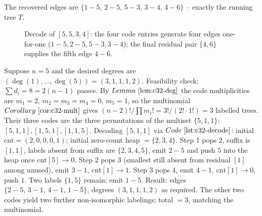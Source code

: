 The recovered edges are \(\{1\!-\!5,\,2\!-\!5,\,5\!-\!3,\,3\!-\!4,\,4\!-\!6\}\)
-- exactly the running tree \(T\).

\begin{figure}[H]
\centering
{}
\caption{Decode of \([5,5,3,4]\): the four code entries generate four edges
one-for-one (\(1\!-\!5, 2\!-\!5, 5\!-\!3, 3\!-\!4\)); the final residual pair
\(\{4,6\}\) supplies the fifth edge \(4\!-\!6\).}
\label{fig:c32-decode}
\end{figure}

\begin{insightbox}
Suppose \(n=5\) and the desired degrees are \((\deg(1),\dots,\deg(5)) =
(3,1,1,1,2)\).  Feasibility check: \(\sum d_i = 8 = 2(n-1)\) passes.
By \(\lemref{c32-deg}\) the code multiplicities are \(m_1=2,\, m_2=m_3=m_4=0,
\,m_5=1\), so the multinomial \(\corref{c32-mult}\) gives \((n-2)!/\prod m_i!
= 3!/(2!\cdot 1!) = 3\) labelled trees.  Their three codes are the three
permutations of the multiset \(\{5,1,1\}\): \([5,1,1], [1,5,1], [1,1,5]\).
Decoding \([5,1,1]\) via \(\coderef{c32-decode}\): initial \(\mathrm{cnt} =
(2,0,0,0,1)\); initial zero-count heap \(= \{2,3,4\}\).  Step 1 pops \(2\),
suffix is \([1,1]\), labels absent from suffix are \(\{2,3,4,5\}\), emit
\(2\!-\!5\) and push \(5\) into the heap once \(\mathrm{cnt}[5]\to 0\).
Step 2 pops \(3\) (smallest still absent from residual \([1]\) among unused),
emit \(3\!-\!1\), \(\mathrm{cnt}[1]\to 1\).  Step 3 pops \(4\), emit \(4\!-\!1\),
\(\mathrm{cnt}[1]\to 0\), push \(1\).  Two labels \(\{1,5\}\) remain; emit
\(1\!-\!5\).  Result: edges \(\{2\!-\!5,\, 3\!-\!1,\, 4\!-\!1,\, 1\!-\!5\}\),
degrees \((3,1,1,1,2)\) as required.  The other two codes yield two further
non-isomorphic labelings; total \(= 3\), matching the multinomial.
\end{insightbox}

